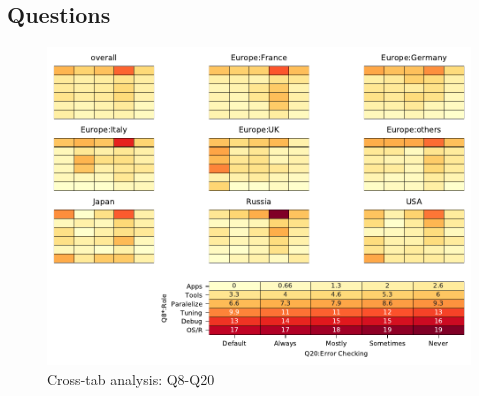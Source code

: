
\subsection{Questions}


\begin{figure}
\begin{center}
\includegraphics[width=12cm]{../pdfs/Q8-Q20.pdf}
\caption{Cross-tab analysis: Q8-Q20}
\label{fig:Q8-Q20}
\end{center}
\end{figure}
